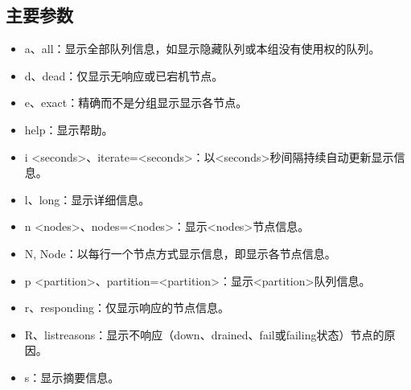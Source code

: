 \documentclass[a4paper,12pt,english]{sphinxmanual}
\begin{document}
\subsection{主要参数}
\label{\detokenize{slurm/slurm:id8}}\begin{itemize}
\item {} 
\sphinxAtStartPar
\sphinxhyphen{}a、\sphinxhyphen{}\sphinxhyphen{}all：显示全部队列信息，如显示隐藏队列或本组没有使用权的队列。

\item {} 
\sphinxAtStartPar
\sphinxhyphen{}d、\sphinxhyphen{}\sphinxhyphen{}dead：仅显示无响应或已宕机节点。

\item {} 
\sphinxAtStartPar
\sphinxhyphen{}e、\sphinxhyphen{}\sphinxhyphen{}exact：精确而不是分组显示显示各节点。

\item {} 
\sphinxAtStartPar
\sphinxhyphen{}\sphinxhyphen{}help：显示帮助。

\item {} 
\sphinxAtStartPar
\sphinxhyphen{}i <seconds>、\sphinxhyphen{}\sphinxhyphen{}iterate=<seconds>：以<seconds>秒间隔持续自动更新显示信息。

\item {} 
\sphinxAtStartPar
\sphinxhyphen{}l、\sphinxhyphen{}\sphinxhyphen{}long：显示详细信息。

\item {} 
\sphinxAtStartPar
\sphinxhyphen{}n <nodes>、\sphinxhyphen{}\sphinxhyphen{}nodes=<nodes>：显示<nodes>节点信息。

\item {} 
\sphinxAtStartPar
\sphinxhyphen{}N, \sphinxhyphen{}\sphinxhyphen{}Node：以每行一个节点方式显示信息，即显示各节点信息。

\item {} 
\sphinxAtStartPar
\sphinxhyphen{}p <partition>、\sphinxhyphen{}\sphinxhyphen{}partition=<partition>：显示<partition>队列信息。

\item {} 
\sphinxAtStartPar
\sphinxhyphen{}r、\sphinxhyphen{}\sphinxhyphen{}responding：仅显示响应的节点信息。

\item {} 
\sphinxAtStartPar
\sphinxhyphen{}R、\sphinxhyphen{}\sphinxhyphen{}list\sphinxhyphen{}reasons：显示不响应（down、drained、fail或failing状态）节点的原因。

\item {} 
\sphinxAtStartPar
\sphinxhyphen{}s：显示摘要信息。


\end{itemize}
\end{document}
